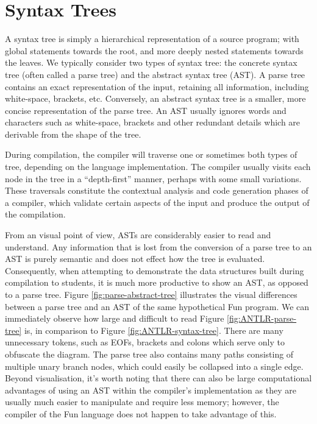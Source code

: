 \documentclass{l4proj}
\begin{document}
\section{Syntax Trees}
A syntax tree is simply a hierarchical representation of a source program; with global statements towards the root, and more deeply nested statements towards the leaves. We typically consider two types of syntax tree: the concrete syntax tree (often called a parse tree) and the abstract syntax tree (AST). A parse tree contains an exact representation of the input, retaining all information, including white-space, brackets, etc. Conversely, an abstract syntax tree is a smaller, more concise representation of the parse tree. An AST usually ignores words and characters such as white-space, brackets and other redundant details which are derivable from the shape of the tree. 

During compilation, the compiler will traverse one or sometimes both types of tree, depending on the language implementation. The compiler usually visits each node in the tree in a ``depth-first'' manner, perhaps with some small variations. These traversals constitute the contextual analysis and code generation phases of a compiler, which validate certain aspects of the input and produce the output of the compilation. 

From an visual point of view, ASTs are considerably easier to read and understand. Any information that is lost from the conversion of a parse tree to an AST is purely semantic and does not effect how the tree is evaluated. Consequently, when attempting to demonstrate the data structures built during compilation to students, it is much more productive to show an AST, as opposed to a parse tree. Figure \ref{fig:parse-abstract-tree} illustrates the visual differences between a parse tree and an AST of the same hypothetical Fun program. We can immediately observe how large and difficult to read Figure \ref{fig:ANTLR-parse-tree} is, in comparison to Figure \ref{fig:ANTLR-syntax-tree}. There are many unnecessary tokens, such as EOFs, brackets and colons which serve only to obfuscate the diagram. The parse tree also contains many paths consisting of multiple unary branch nodes, which could easily be collapsed into a single edge. Beyond visualisation, it's worth noting that there can  also be large computational advantages of using an AST within the compiler's implementation as they are usually much easier to manipulate and require less memory; however, the compiler of the Fun language does not happen to take advantage of this. 
\end{document}
